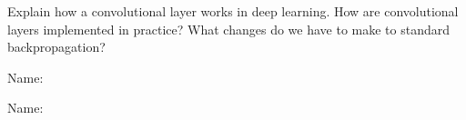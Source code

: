 \documentclass[11pt]{article}
\newcounter{marks}
\begin{document}
\begin{list}{{\bf Question :}}
\item
{}
\addtocounter{marks}{1}
Explain how a convolutional layer works in deep learning. How are convolutional layers implemented in practice? What changes do we have to make to standard backpropagation?

\framebox[16cm][l]{ 
\parbox{15.9cm}{
\vspace*{6.5cm}
}}



\pagebreak

Name: \dotfill

\item
{}
\addtocounter{marks}{1}


\framebox[16cm][l]{ 
\parbox{15.9cm}{
\vspace*{9cm}
}}

\item
{}
\addtocounter{marks}{1}


\framebox[16cm][l]{ 
\parbox{15.9cm}{
\vspace*{9cm}
}}



\pagebreak

Name: \dotfill

\item
{}
\addtocounter{marks}{1}


\framebox[16cm][l]{ 
\parbox{15.9cm}{
\vspace*{4.5cm}
}}

\item
{}
\addtocounter{marks}{1}


\framebox[16cm][l]{ 
\parbox{15.9cm}{
\vspace*{5cm}
}}

\item
{}
\addtocounter{marks}{2}


\framebox[16cm][l]{ 
\parbox{15.9cm}{
\vspace*{7.5cm}
}}


\end{list}
\end{document}
